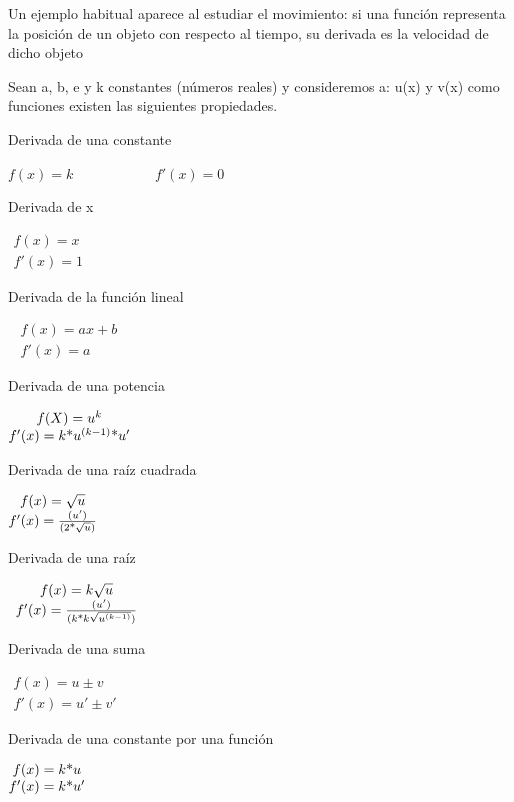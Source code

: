 \documentclass{article}
\newcommand\normalsubformula[1]{\text{\mathversion{normal}$#1$}}
\begin{document}
Un ejemplo habitual aparece al estudiar el movimiento: si una funci\'on representa la posici\'on de un objeto con respecto al tiempo, su derivada es la velocidad de dicho objeto

Sean a, b, e y k constantes (n\'umeros reales) y consideremos a: u(x) y v(x) como funciones existen las siguientes propiedades.

Derivada de una constante

 $f(x)=k$ \ \ \ \ \ \ \ \ \ \ \  $f'(x)=0$

Derivada de x

 $\begin{matrix}f(x)=x\\f'(x)=1\end{matrix}$

Derivada de la funci\'on lineal

\  $\begin{matrix}f(x)=ax+b\\f'(x)=a\end{matrix}$

Derivada de una potencia

 $\begin{matrix}f(X)=u^{k}\\f'(x)=k\normalsubformula{\text{*}}u^{(k-1)}\normalsubformula{\text{*}}u'\end{matrix}$

Derivada de una ra\'iz cuadrada

 $\begin{matrix}f(x)=\sqrt{u}\\f'(x)=\frac{(u')}{(2\normalsubformula{\text{*}}\sqrt{u})}\end{matrix}$

Derivada de una ra\'iz

\  $\begin{matrix}f(x)=k\sqrt{u}\\f'(x)=\frac{(u')}{(k\normalsubformula{\text{*}}k\sqrt{u^{(k-1)}})}\end{matrix}$

Derivada de una suma

 $\begin{matrix}f(x)=u\pm v\\f'(x)=u'\pm v'\end{matrix}$

Derivada de una constante por una funci\'on

 $\begin{matrix}f(x)=k\normalsubformula{\text{*}}u\\f'(x)=k\normalsubformula{\text{*}}u'\end{matrix}$
\end{document}
